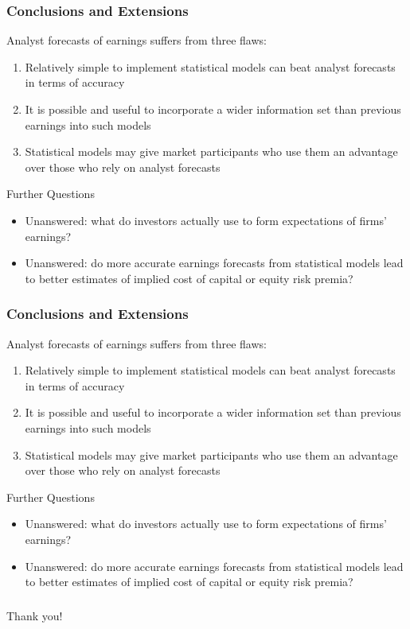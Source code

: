 \documentclass{beamer}
\begin{document}
\begin{frame}
\frametitle{Conclusions and Extensions}
Analyst forecasts of earnings suffers from three flaws: 
\begin{enumerate}
\item Relatively simple to implement statistical models can beat analyst forecasts in terms of accuracy 
\item It is possible and useful to incorporate a wider information set than previous earnings into such models
\item Statistical models may give market participants who use them an advantage over those who rely on analyst forecasts
\end{enumerate}
Further Questions
\begin{itemize}
\item Unanswered: what do investors actually use to form expectations of firms' earnings?
\item Unanswered: do more accurate earnings forecasts from statistical models lead to better estimates of implied cost of capital or equity risk premia?
\end{itemize}
\end{frame}

\begin{frame}
\frametitle{Conclusions and Extensions}
Analyst forecasts of earnings suffers from three flaws: 
\begin{enumerate}
\item Relatively simple to implement statistical models can beat analyst forecasts in terms of accuracy 
\item It is possible and useful to incorporate a wider information set than previous earnings into such models
\item Statistical models may give market participants who use them an advantage over those who rely on analyst forecasts
\end{enumerate}
Further Questions
\begin{itemize}
\item Unanswered: what do investors actually use to form expectations of firms' earnings?
\item Unanswered: do more accurate earnings forecasts from statistical models lead to better estimates of implied cost of capital or equity risk premia?
\end{itemize}
\end{frame}

\begin{frame}
\frametitle{}
\begin{center}Thank you!\end{center}
\end{frame}
\end{document}
